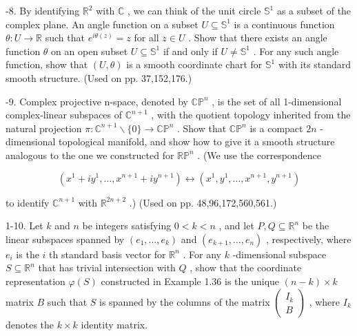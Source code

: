 \begin{exercise}
\label{prob:1-8}
-8. By identifying ${\mathbb{R}}^{2}$ with $\mathbb{C}$ , we can think of the unit circle ${\mathbb{S}}^{1}$ as a subset of the complex plane. An angle function on a subset $U \subseteq  {\mathbb{S}}^{1}$ is a continuous function $\theta  : U \rightarrow  \mathbb{R}$ such that ${e}^{{i\theta }\left( z\right) } = z$ for all $z \in  U$ . Show that there exists an angle function $\theta$ on an open subset $U \subseteq  {\mathbb{S}}^{1}$ if and only if $U \neq  {\mathbb{S}}^{1}$ . For any such angle function, show that $\left( {U,\theta }\right)$ is a smooth coordinate chart for ${\mathbb{S}}^{1}$ with its standard smooth structure. (Used on pp. 37,152,176.)
\end{exercise}

\begin{exercise}
\label{prob:1-9}
-9. Complex projective n-space, denoted by ${\mathbb{{CP}}}^{n}$ , is the set of all 1-dimensional complex-linear subspaces of ${\mathbb{C}}^{n + 1}$ , with the quotient topology inherited from the natural projection $\pi  : {\mathbb{C}}^{n + 1} \smallsetminus  \{ 0\}  \rightarrow  {\mathbb{{CP}}}^{n}$ . Show that ${\mathbb{{CP}}}^{n}$ is a compact ${2n}$ -dimensional topological manifold, and show how to give it a smooth structure analogous to the one we constructed for ${\mathbb{{RP}}}^{n}$ . (We use the correspondence

\[
\left( {{x}^{1} + i{y}^{1},\ldots ,{x}^{n + 1} + i{y}^{n + 1}}\right)  \leftrightarrow  \left( {{x}^{1},{y}^{1},\ldots ,{x}^{n + 1},{y}^{n + 1}}\right)
\]

to identify ${\mathbb{C}}^{n + 1}$ with ${\mathbb{R}}^{{2n} + 2}$ .) (Used on pp. 48,96,172,560,561.)
\end{exercise}

\begin{exercise}
\label{prob:1-10}
\leanok
{}
1-10. Let $k$ and $n$ be integers satisfying $0 < k < n$ , and let $P, Q \subseteq  {\mathbb{R}}^{n}$ be the linear subspaces spanned by $\left( {{e}_{1},\ldots ,{e}_{k}}\right)$ and $\left( {{e}_{k + 1},\ldots ,{e}_{n}}\right)$ , respectively, where ${e}_{i}$ is the $i$ th standard basis vector for ${\mathbb{R}}^{n}$ . For any $k$ -dimensional subspace $S \subseteq  {\mathbb{R}}^{n}$ that has trivial intersection with $Q$ , show that the coordinate representation $\varphi \left( S\right)$ constructed in Example 1.36 is the unique $\left( {n - k}\right)  \times  k$ matrix $B$ such that $S$ is spanned by the columns of the matrix $\left( \begin{matrix} {I}_{k} \\  B \end{matrix}\right)$ , where ${I}_{k}$ denotes the $k \times  k$ identity matrix.
\end{exercise}

